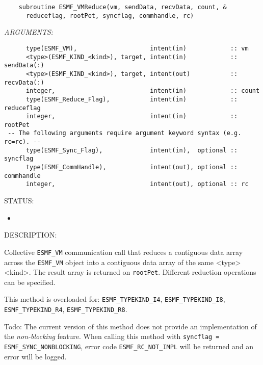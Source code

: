   
\begin{verbatim}    subroutine ESMF_VMReduce(vm, sendData, recvData, count, &
      reduceflag, rootPet, syncflag, commhandle, rc)\end{verbatim}{\em ARGUMENTS:}
\begin{verbatim}      type(ESMF_VM),                    intent(in)            :: vm
      <type>(ESMF_KIND_<kind>), target, intent(in)            :: sendData(:)
      <type>(ESMF_KIND_<kind>), target, intent(out)           :: recvData(:)
      integer,                          intent(in)            :: count
      type(ESMF_Reduce_Flag),           intent(in)            :: reduceflag
      integer,                          intent(in)            :: rootPet
 -- The following arguments require argument keyword syntax (e.g. rc=rc). --
      type(ESMF_Sync_Flag),             intent(in),  optional :: syncflag
      type(ESMF_CommHandle),            intent(out), optional :: commhandle
      integer,                          intent(out), optional :: rc\end{verbatim}
{\sf STATUS:}
   \begin{itemize}
   \item{}
   \end{itemize}
  
{\sf DESCRIPTION:\\ }


     Collective {\tt ESMF\_VM} communication call that reduces a contiguous data 
     array across the {\tt ESMF\_VM} object into a contiguous data array of 
     the same <type><kind>. The result array is returned on {\tt rootPet}. 
     Different reduction operations can be specified.
  
     This method is overloaded for:
     {\tt ESMF\_TYPEKIND\_I4}, {\tt ESMF\_TYPEKIND\_I8},
     {\tt ESMF\_TYPEKIND\_R4}, {\tt ESMF\_TYPEKIND\_R8}.
  
     {\sc Todo:} The current version of this method does not provide an 
     implementation of the {\em non-blocking} feature. When calling this 
     method with {\tt syncflag = ESMF\_SYNC\_NONBLOCKING}, error code 
     {\tt ESMF\_RC\_NOT\_IMPL} will be returned and an error will be 
     logged.
  
